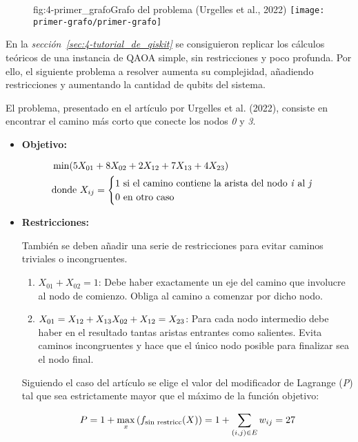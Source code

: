 \begin{figure}[Grafo de 4 nodos {--} camino más corto]{fig:4-primer_grafo}{Grafo del problema (Urgelles et al., 2022\cite{multi-objective_routing_optimization})}
  \centering
  \texttt{[image: primer-grafo/primer-grafo]}
\end{figure}

En la \textit{sección~\ref{sec:4-tutorial_de_qiskit}} se consiguieron replicar los cálculos teóricos de una instancia de QAOA simple, sin restricciones y poco profunda.
Por ello, el siguiente problema a resolver aumenta su complejidad, añadiendo restricciones y aumentando la cantidad de qubits del sistema.

El problema, presentado en el artículo por Urgelles et al. (2022)\cite{multi-objective_routing_optimization}, consiste en encontrar el camino más corto que conecte los nodos \textit{0} y \textit{3}.

\begin{itemize}
\item \textbf{Objetivo:}

  \begin{align}
    &\min(5X_{01} + 8X_{02} + 2X_{12} + 7X_{13} + 4X_{23}) \\
    &\textnormal{donde } X_{ij} = \begin{cases} \nonumber
      1 \textnormal{ si el camino contiene la arista del nodo \textit{i} al \textit{j}} \\
      0 \textnormal{ en otro caso}
    \end{cases}
  \end{align}
  
\item \textbf{Restricciones:}

  También se deben añadir una serie de restricciones para evitar caminos triviales o incongruentes.

  \begin{enumerate}
  \item\label{it:4-primer_grafo_restriccion_ini} $X_{01} + X_{02} = 1$:
    Debe haber exactamente un eje del camino que involucre al nodo de comienzo.
    Obliga al camino a comenzar por dicho nodo.

  \item\label{it:4-primer_grafo_restriccion_inter} $X_{01} = X_{12} + X_{13} \\
    X_{02} + X_{12} = X_{23}$:
    Para cada nodo intermedio debe haber en el resultado tantas aristas entrantes como salientes.
    Evita caminos incongruentes y hace que el único nodo posible para finalizar sea el nodo final.
  \end{enumerate}

  Siguiendo el caso del artículo\cite{multi-objective_routing_optimization} se elige el valor del modificador de Lagrange (\textit{P}) tal que sea estrictamente mayor que el máximo de la función objetivo:

  \begin{align}
    P = 1 + \max_{x}{(f_{\textnormal{sin restricc}}(X))} = 1 + \sum_{(i, j)\in{E}}{w_{ij}} = 27
  \end{align}

\end{itemize}

